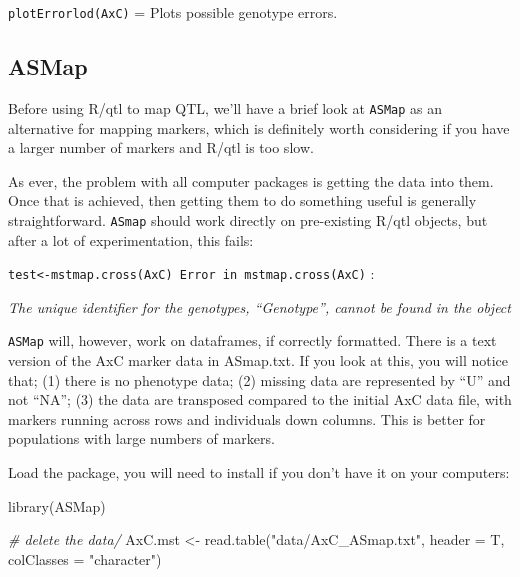 \documentclass[
]{book}
\newenvironment{Shaded}{\begin{snugshade}}{\end{snugshade}}
\newcommand{\AttributeTok}[1]{\textcolor[rgb]{0.77,0.63,0.00}{#1}}
\newcommand{\CommentTok}[1]{\textcolor[rgb]{0.56,0.35,0.01}{\textit{#1}}}
\newcommand{\FunctionTok}[1]{\textcolor[rgb]{0.00,0.00,0.00}{#1}}
\newcommand{\NormalTok}[1]{#1}
\newcommand{\OtherTok}[1]{\textcolor[rgb]{0.56,0.35,0.01}{#1}}
\newcommand{\StringTok}[1]{\textcolor[rgb]{0.31,0.60,0.02}{#1}}
\begin{document}
\texttt{plotErrorlod(AxC)} = Plots possible genotype errors.

\hypertarget{asmap}{%
\subsection{ASMap}\label{asmap}}

Before using R/qtl to map QTL, we'll have a brief look at \texttt{ASMap} as an alternative for mapping markers, which is definitely worth considering if you have a larger number of markers and R/qtl is too slow.

As ever, the problem with all computer packages is getting the data into them. Once that is achieved, then getting them to do something useful is generally straightforward. \texttt{ASmap} should work directly on pre-existing R/qtl objects, but after a lot of experimentation, this fails:

\texttt{test\textless{}-mstmap.cross(AxC)\ Error\ in\ mstmap.cross(AxC)} :

\emph{The unique identifier for the genotypes, ``Genotype'', cannot be found in the object}

\texttt{ASMap} will, however, work on dataframes, if correctly formatted. There is a text version of the AxC marker data in ASmap.txt. If you look at this, you will notice that; (1) there is no phenotype data; (2) missing data are represented by ``U'' and not ``NA''; (3) the data are transposed compared to the initial AxC data file, with markers running across rows and individuals down columns. This is better for populations with large numbers of markers.

Load the package, you will need to install if you don't have it on your computers:

\begin{Shaded}
\begin{Highlighting}[]
\FunctionTok{library}\NormalTok{(ASMap)}
\end{Highlighting}
\end{Shaded}

\begin{Shaded}
\begin{Highlighting}[]
\CommentTok{\# delete the \textquotesingle{}data/\textquotesingle{}}
\NormalTok{AxC.mst }\OtherTok{\textless{}{-}} \FunctionTok{read.table}\NormalTok{(}\StringTok{"data/AxC\_ASmap.txt"}\NormalTok{, }\AttributeTok{header =}\NormalTok{ T, }\AttributeTok{colClasses =} \StringTok{"character"}\NormalTok{)}
\end{Highlighting}
\end{Shaded}
\end{document}
